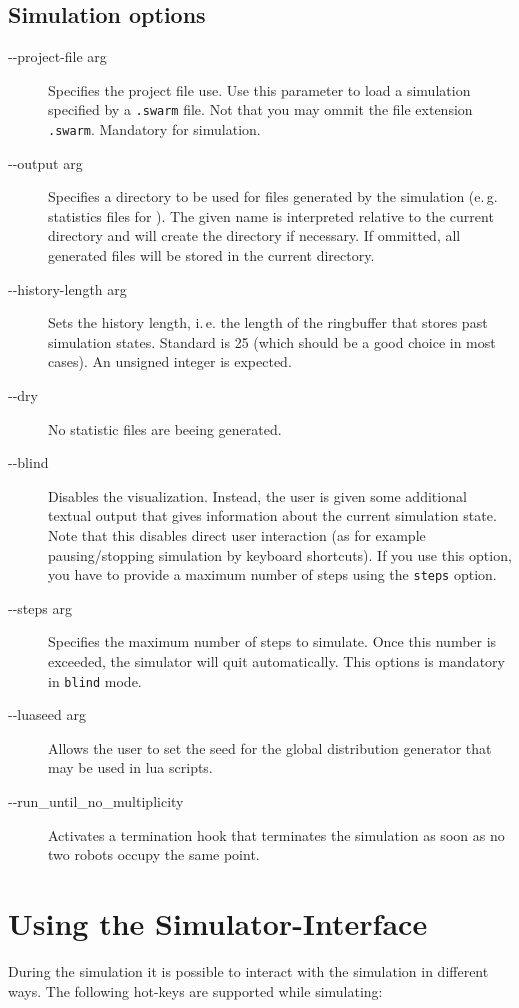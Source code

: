 \subsection{Simulation options}
\begin{description}
	\item [-{}-project-file arg] Specifies the project file use. Use this parameter to load a simulation specified by a {\tt .swarm} file. Not that you may ommit the file extension {\tt .swarm}. Mandatory for simulation.
	\item [-{}-output arg] Specifies a directory to be used for files generated by the simulation (e.\,g. statistics files for \gnuplot). The given name is interpreted relative to the current directory and will create the directory if necessary. If ommitted, all generated files will be stored in the current directory.
	\item [-{}-history-length arg] Sets the history length, i.\,e. the length of the ringbuffer that stores past simulation states. Standard is 25 (which should be a good choice in most cases). An unsigned integer is expected.
	\item [-{}-dry] No statistic files are beeing generated.
	\item [-{}-blind] Disables the visualization. Instead, the user is given some additional textual output that gives information about the current simulation state. Note that this disables direct user interaction (as for example pausing/stopping simulation by keyboard shortcuts). If you use this option, you have to provide a maximum number of steps using the \texttt{steps} option.
	\item [-{}-steps arg] Specifies the maximum number of steps to simulate. Once this number is exceeded, the simulator will quit automatically. This options is mandatory in \texttt{blind} mode.
	\item [-{}-luaseed arg] Allows the user to set the seed for the global distribution generator that may be used in lua scripts.
	\item [-{}-run\_until\_no\_multiplicity] Activates a termination hook that terminates the simulation as soon as no two robots occupy the same point.
\end{description}


\section{Using the Simulator-Interface}
During the simulation it is possible to interact with the simulation in different ways. The following hot-keys are supported while simulating:

